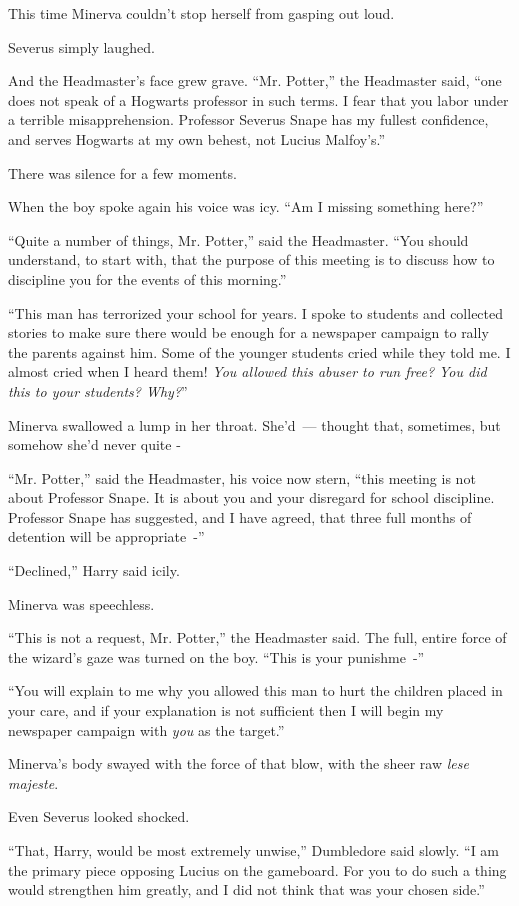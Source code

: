 This time Minerva couldn't stop herself from gasping out loud.

Severus simply laughed.

And the Headmaster's face grew grave. ``Mr. Potter,'' the Headmaster said, ``one does not speak of a Hogwarts professor in such terms. I fear that you labor under a terrible misapprehension. Professor Severus Snape has my fullest confidence, and serves Hogwarts at my own behest, not Lucius Malfoy's.''

There was silence for a few moments.

When the boy spoke again his voice was icy. ``Am I missing something here?''

``Quite a number of things, Mr. Potter,'' said the Headmaster. ``You should understand, to start with, that the purpose of this meeting is to discuss how to discipline you for the events of this morning.''

``This man has terrorized your school for years. I spoke to students and collected stories to make sure there would be enough for a newspaper campaign to rally the parents against him. Some of the younger students cried while they told me. I almost cried when I heard them! \emph{You allowed this abuser to run free? You did this to your students? Why?}''

Minerva swallowed a lump in her throat. She'd~--- thought that, sometimes, but somehow she'd never quite -

``Mr. Potter,'' said the Headmaster, his voice now stern, ``this meeting is not about Professor Snape. It is about you and your disregard for school discipline. Professor Snape has suggested, and I have agreed, that three full months of detention will be appropriate~-''

``Declined,'' Harry said icily.

Minerva was speechless.

``This is not a request, Mr. Potter,'' the Headmaster said. The full, entire force of the wizard's gaze was turned on the boy. ``This is your punishme~-''

``You will explain to me why you allowed this man to hurt the children placed in your care, and if your explanation is not sufficient then I will begin my newspaper campaign with \emph{you} as the target.''

Minerva's body swayed with the force of that blow, with the sheer raw \emph{lese majeste}.

Even Severus looked shocked.

``That, Harry, would be most extremely unwise,'' Dumbledore said slowly. ``I am the primary piece opposing Lucius on the gameboard. For you to do such a thing would strengthen him greatly, and I did not think that was your chosen side.''

